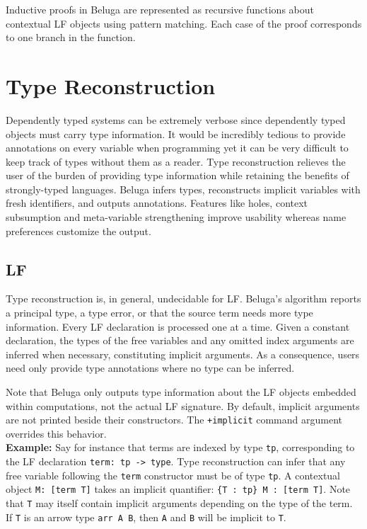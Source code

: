 \documentclass[11pt]{article}
\begin{document}
Inductive proofs in Beluga are represented as recursive functions about contextual LF objects using pattern matching. Each case of the proof corresponds to one branch in the function.



\section{Type Reconstruction}
Dependently typed systems can be extremely verbose since dependently typed objects must carry type information. It would be incredibly tedious to provide annotations on every variable when programming yet it can be very difficult to keep track of types without them as a reader. Type reconstruction relieves the user of the burden of providing type information while retaining the benefits of strongly-typed languages. Beluga infers types, reconstructs implicit variables with fresh identifiers, and outputs annotations. Features like holes, context subsumption and meta-variable strengthening improve usability whereas name preferences customize the output.

\subsection{LF}
Type reconstruction is, in general, undecidable for LF. Beluga's algorithm reports a principal type, a type error, or that the source term needs more type information. Every LF declaration is processed one at a time. Given a constant declaration, the types of the free variables and any omitted index arguments are inferred when necessary, constituting implicit arguments. As a consequence, users need only provide type annotations where no type can be inferred.

Note that Beluga only outputs type information about the LF objects embedded within computations, not the actual LF signature. By default, implicit arguments are not printed beside their constructors. The \texttt{+implicit} command argument overrides this behavior. \\

\textbf{Example:} Say for instance that terms are indexed by type \texttt{tp}, corresponding to the LF declaration \texttt{term: tp -> type}. Type reconstruction can infer that any free variable following the \texttt{term} constructor must be of type \texttt{tp}. A contextual object \texttt{M: [term T]} takes an implicit quantifier: \texttt{\{T : tp\} M : [term T]}. Note that \texttt{T} may itself contain implicit arguments depending on the type of the term. If \texttt{T} is an arrow type \texttt{arr A B}, then \texttt{A} and \texttt{B} will be implicit to \texttt{T}.
\end{document}
